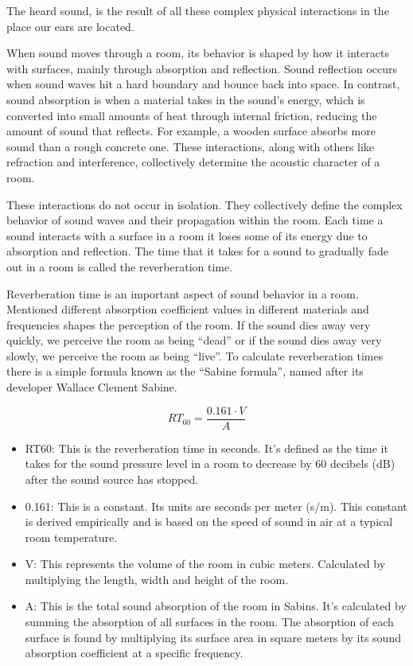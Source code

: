             The heard sound, is the result of all these complex physical interactions in the place our ears are located.\par

            When sound moves through a room, its behavior is shaped by how it interacts with surfaces, mainly through absorption and reflection. Sound reflection occurs when sound waves hit a hard boundary and bounce back into space. In contrast, sound absorption is when a material takes in the sound's energy, which is converted into small amounts of heat through internal friction, reducing the amount of sound that reflects\cite{Acoustics_and_Psychophysics}. For example, a wooden surface absorbs more sound than a rough concrete one. These interactions, along with others like refraction and interference, collectively determine the acoustic character of a room.\par

            These interactions do not occur in isolation. They collectively define the complex behavior of sound waves and their propagation within the room. Each time a sound interacts with a surface in a room it loses some of its energy due to absorption and reflection. The time that it takes for a sound to gradually fade out in a room is called the reverberation time.\par

            Reverberation time is an important aspect of sound behavior in a room. Mentioned different absorption coefficient values in different materials and frequencies shapes the perception of the room. If the sound dies away very quickly, we perceive the room as being “dead” or if the sound dies away very slowly, we perceive the room as being “live”. To calculate reverberation times there is a simple formula known as the “Sabine formula”, named after its developer Wallace Clement Sabine\cite{Acoustics_and_Psychophysics}.\par 
            $$RT_{60} = \frac{0.161 \cdot V}{A}$$
            \begin{itemize}
                \item RT60: This is the reverberation time in seconds. It's defined as the time it takes for the sound pressure level in a room to decrease by 60 decibels (dB) after the sound source has stopped\cite{Room_Acoustics}.
                \item 0.161: This is a constant. Its units are seconds per meter (s/m). This constant is derived empirically and is based on the speed of sound in air at a typical room temperature.
                \item V: This represents the volume of the room in cubic meters. Calculated by multiplying the length, width and height of the room.
                \item A: This is the total sound absorption of the room in Sabins. It's calculated by summing the absorption of all surfaces in the room. The absorption of each surface is found by multiplying its surface area in square meters by its sound absorption coefficient at a specific frequency.
            \end{itemize}

